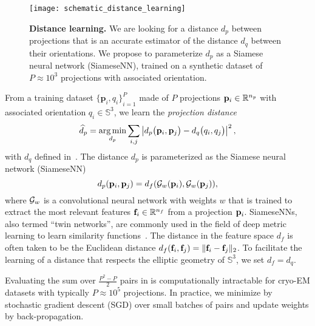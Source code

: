 \begin{figure}
    \centering
    \texttt{[image: schematic\_distance\_learning]}
    \caption{%
        \textbf{Distance learning.}
        We are looking for a distance $d_p$ between projections that is an accurate estimator of the distance $d_q$ between their orientations.
        We propose to parameterize $d_p$ as a Siamese neural network (SiameseNN), trained on a synthetic dataset of $P \approx 10^3$ projections with associated orientation.
}\label{fig:schematic:distance-learning}
\end{figure}

From a training dataset ${\{ \mathbf{p}_{i}, q_i \}}_{i=1}^{P}$ made of $P$ projections $\mathbf{p}_i \in \mathbb{R}^{n_p}$ with associated orientation $q_i \in \mathbb{S}^3$, we learn the \textit{projection distance}
\begin{equation}
    \widehat{d}_p = \operatorname*{arg\,min}_{d_p} \sum_{i,j} \left| d_p\big(\mathbf{p}_{i},\mathbf{p}_{j}\big) - d_q\big(q_i,q_j\big) \right|^2,
    \label{eqn:distance-learning}
\end{equation}
with $d_q$ defined in~.
The distance $d_p$ is parameterized as the Siamese neural network (SiameseNN)~\cite{chopra2005learning}
\begin{equation*}
    d_p(\mathbf{p}_i, \mathbf{p}_j) = d_f(\mathcal{G}_w(\mathbf{p}_i), \mathcal{G}_w(\mathbf{p}_j)),
\end{equation*}
where $\mathcal{G}_w$ is a convolutional neural network with weights $w$ that is trained to extract the most relevant features $\mathbf{f}_i \in \mathbb{R}^{n_f}$ from a projection $\mathbf{p}_i$. SiameseNNs, also termed ``twin networks'', are commonly used in the field of deep metric learning to learn similarity functions~\cite{yi2014deep}.
The distance in the feature space $d_f$ is often taken to be the Euclidean distance $d_f(\mathbf{f}_i, \mathbf{f}_j) = \Vert \mathbf{f}_i - \mathbf{f}_j \Vert_2$.
To facilitate the learning of a distance that respects the elliptic geometry of $\mathbb{S}^3$, we set $d_f = d_q$.

Evaluating the sum over $\frac{P^2-P}{2}$ pairs in  is computationally intractable for cryo-EM datasets with typically $P \approx 10^5$ projections.
In practice, we minimize  by stochastic gradient descent (SGD) over small batches of pairs and update weights by back-propagation.

